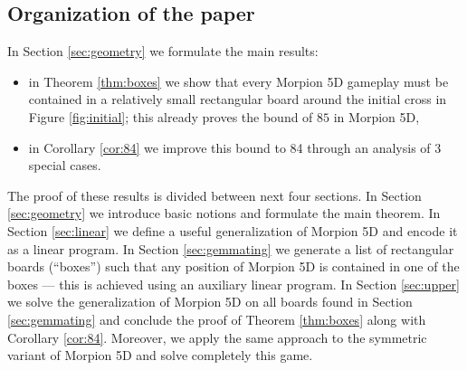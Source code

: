 
\subsection{Organization of the paper}
In Section \ref{sec:geometry} we formulate the main results:
\begin{itemize}
\item in Theorem \ref{thm:boxes} we show that every Morpion 5D gameplay must be contained in a relatively small rectangular board around the initial cross in Figure \ref{fig:initial}; this already proves the bound of $85$ in Morpion 5D,
\item in Corollary \ref{cor:84} we improve this bound to 84 through an analysis of $3$ special cases.
\end{itemize}
The proof of these results is divided between next four sections. In Section \ref{sec:geometry} we introduce basic notions and formulate the main theorem. In Section \ref{sec:linear} we define a useful generalization of Morpion 5D  and encode it as a linear program. In Section \ref{sec:gemmating} we generate a list of rectangular boards (``boxes'') such that any position of Morpion 5D is contained in one of the boxes --- this is achieved using an auxiliary linear program. In Section \ref{sec:upper} we solve 
the generalization of Morpion 5D on all boards found in Section \ref{sec:gemmating} and conclude the proof of Theorem \ref{thm:boxes} along with Corollary \ref{cor:84}. Moreover, we apply the same approach to the symmetric variant of Morpion 5D and solve completely this game. %



